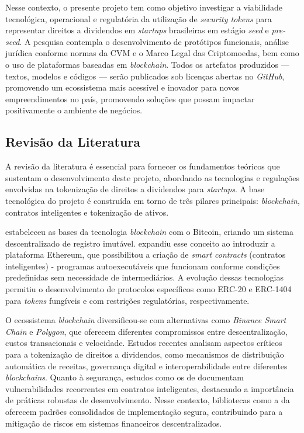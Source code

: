 \documentclass[12pt, a4paper, oneside, openright, chapter=TITLE]{abntex2}
\begin{document}
Nesse contexto, o presente projeto tem como objetivo investigar a viabilidade tecnológica, operacional e regulatória da utilização de \textit{security tokens} para representar direitos a dividendos em \textit{startups} brasileiras em estágio \textit{seed} e \textit{pre-seed}. A pesquisa contempla o desenvolvimento de protótipos funcionais, análise jurídica conforme normas da CVM e o Marco Legal das Criptomoedas, bem como o uso de plataformas baseadas em \textit{blockchain}. Todos os artefatos produzidos — textos, modelos e códigos — serão publicados sob licenças abertas no \textit{GitHub}, promovendo um ecossistema mais acessível e inovador para novos empreendimentos no país, promovendo soluções que possam impactar positivamente o ambiente de negócios.

\subsection{Revisão da Literatura}

\hspace*{\parindent} A revisão da literatura é essencial para fornecer os fundamentos teóricos que sustentam o desenvolvimento deste projeto, abordando as tecnologias e regulações envolvidas na tokenização de direitos a dividendos para \textit{startups}. A base tecnológica do projeto é construída em torno de três pilares principais: \textit{blockchain}, contratos inteligentes e tokenização de ativos.

 estabeleceu as bases da tecnologia \textit{blockchain} com o Bitcoin, criando um sistema descentralizado de registro imutável.  expandiu esse conceito ao introduzir a plataforma Ethereum, que possibilitou a criação de \textit{smart contracts} (contratos inteligentes) - programas autoexecutáveis que funcionam conforme condições predefinidas sem necessidade de intermediários. A evolução dessas tecnologias permitiu o desenvolvimento de protocolos específicos como ERC-20 e ERC-1404 para \textit{tokens} fungíveis e com restrições regulatórias, respectivamente.

O ecossistema \textit{blockchain} diversificou-se com alternativas como \textit{Binance Smart Chain} e \textit{Polygon}, que oferecem diferentes compromissos entre descentralização, custos transacionais e velocidade. Estudos recentes \cite{wang2023smart, kaal2022defi, beck2021real} analisam aspectos críticos para a tokenização de direitos a dividendos, como mecanismos de distribuição automática de receitas, governança digital e interoperabilidade entre diferentes \textit{blockchains}. Quanto à segurança, estudos como os de  documentam vulnerabilidades recorrentes em contratos inteligentes, destacando a importância de práticas robustas de desenvolvimento. Nesse contexto, bibliotecas como a da  oferecem padrões consolidados de implementação segura, contribuindo para a mitigação de riscos em sistemas financeiros descentralizados.
\end{document}
